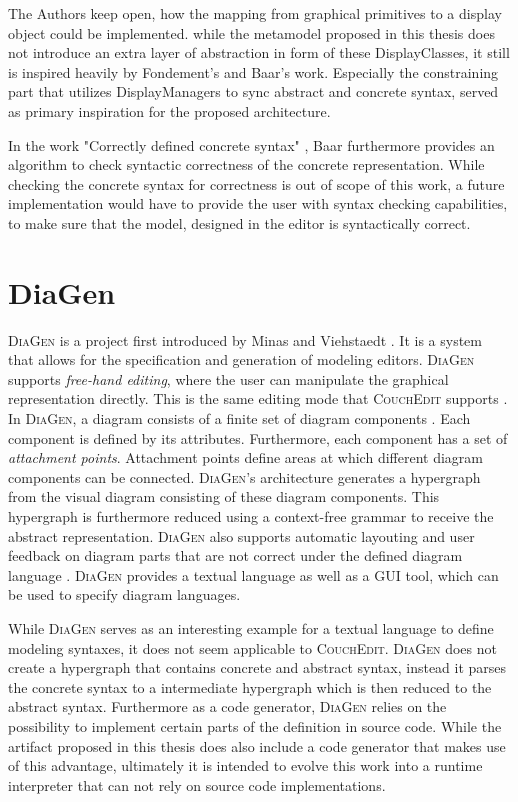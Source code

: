 The Authors keep open, how the mapping from graphical primitives to a display object could be implemented. while the metamodel proposed in this thesis does not introduce an extra layer of abstraction in form of these DisplayClasses, it still is inspired heavily by Fondement's and Baar's work. Especially the constraining part that utilizes DisplayManagers to sync abstract and concrete syntax, served as primary inspiration for the proposed architecture.

In the work "Correctly defined concrete syntax" \cite{baar_correctly_2008}, Baar furthermore provides an algorithm to check syntactic correctness of the concrete representation. While checking the concrete syntax for correctness is out of scope of this work, a future implementation would have to provide the user with syntax checking capabilities, to make sure that the model, designed in the editor is syntactically correct.


\section{DiaGen}
\label{sec:diagen}
\textsc{DiaGen} is a project first introduced by Minas and Viehstaedt \cite{minas_diagen_1995}. It is a system that allows for the specification and generation of modeling editors. \textsc{DiaGen} supports \emph{free-hand editing}, where the user can manipulate the graphical representation directly. This is the same editing mode that \textsc{CouchEdit} supports \cite{nachreiner_couchedit_2020}. In \textsc{DiaGen}, a diagram consists of a finite set of diagram components \cite{minas_concepts_2002}. Each component is defined by its attributes. Furthermore, each component has a set of \emph{attachment points}. Attachment points define areas at which different diagram components can be connected. \textsc{DiaGen}'s architecture generates a hypergraph from the visual diagram consisting of these diagram components. This hypergraph is furthermore reduced using a context-free grammar to receive the abstract representation. \textsc{DiaGen} also supports automatic layouting and user feedback on diagram parts that are not correct under the defined diagram language \cite{minas_concepts_2002}. \textsc{DiaGen} provides a textual language as well as a GUI tool, which can be used to specify diagram languages. 

While \textsc{DiaGen} serves as an interesting example for a textual language to define modeling syntaxes, it does not seem applicable to \textsc{CouchEdit}. \textsc{DiaGen} does not create a hypergraph that contains concrete and abstract syntax, instead it parses the concrete syntax to a intermediate hypergraph which is then reduced to the abstract syntax. Furthermore as a code generator, \textsc{DiaGen} relies on the possibility to implement certain parts of the definition in source code. While the artifact proposed in this thesis does also include a code generator that makes use of this advantage, ultimately it is intended to evolve this work into a runtime interpreter that can not rely on source code implementations. 



